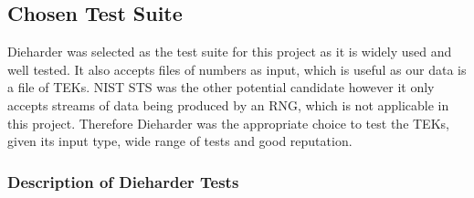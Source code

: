 \subsection{Chosen Test Suite}

Dieharder was selected as the test suite for this project as it is widely used and well tested. It also accepts files of numbers as input, which is useful as our data is a file of TEKs. NIST STS was the other potential candidate however it only accepts streams of data being produced by an RNG, which is not applicable in this project. Therefore Dieharder was the appropriate choice to test the TEKs, given its input type, wide range of tests and good reputation. 

\subsubsection{Description of Dieharder Tests}


